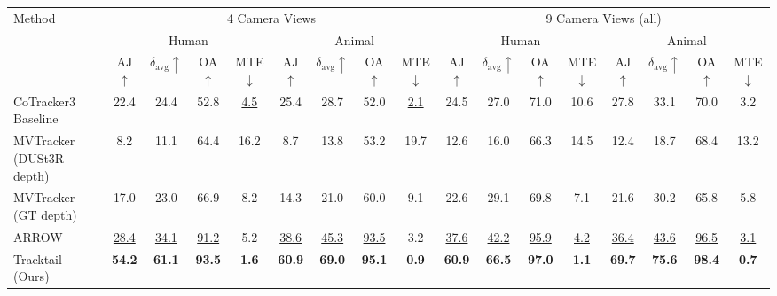 \begin{tabular}{l cccc cccc cccc cccc}
\toprule
\multirow{3}{*}{Method}
  & \multicolumn{8}{c}{4 Camera Views}
  & \multicolumn{8}{c}{9 Camera Views (all)} \\
\cmidrule(lr){2-9}\cmidrule(lr){10-17}
  & \multicolumn{4}{c}{Human}
  & \multicolumn{4}{c}{Animal}
  & \multicolumn{4}{c}{Human}
  & \multicolumn{4}{c}{Animal} \\
\cmidrule(lr){2-5}\cmidrule(lr){6-9}\cmidrule(lr){10-13}\cmidrule(lr){14-17}
  & AJ$\uparrow$ & $\delta_\text{avg}\uparrow$ & OA$\uparrow$ & MTE$\downarrow$
  & AJ$\uparrow$ & $\delta_\text{avg}\uparrow$ & OA$\uparrow$ & MTE$\downarrow$
  & AJ$\uparrow$ & $\delta_\text{avg}\uparrow$ & OA$\uparrow$ & MTE$\downarrow$
  & AJ$\uparrow$ & $\delta_\text{avg}\uparrow$ & OA$\uparrow$ & MTE$\downarrow$ \\
\midrule
\rowcolor{rowgray}
CoTracker3 Baseline~\cite{karaev24cotracker3}
  & 22.4 & 24.4 & 52.8 & \underline{4.5} & 25.4 & 28.7 & 52.0 & \underline{2.1} & 24.5 & 27.0 & 71.0 & 10.6 & 27.8 & 33.1 & 70.0 & 3.2 \\
MVTracker~\cite{rajic2025mvtracker} (DUSt3R depth)
  & 8.2 & 11.1 & 64.4 & 16.2 & 8.7 & 13.8 & 53.2 & 19.7 & 12.6 & 16.0 & 66.3 & 14.5 & 12.4 & 18.7 & 68.4 & 13.2 \\
\rowcolor{rowgray}
MVTracker~\cite{rajic2025mvtracker} (GT depth)
  & 17.0 & 23.0 & 66.9 & 8.2 & 14.3 & 21.0 & 60.0 & 9.1 & 22.6 & 29.1 & 69.8 & 7.1 & 21.6 & 30.2 & 65.8 & 5.8 \\
ARROW~\cite{fradlin2026arrow}
  & \underline{28.4} & \underline{34.1} & \underline{91.2} & 5.2 & \underline{38.6} & \underline{45.3} & \underline{93.5} & 3.2 & \underline{37.6} & \underline{42.2} & \underline{95.9} & \underline{4.2} & \underline{36.4} & \underline{43.6} & \underline{96.5} & \underline{3.1} \\
\rowcolor{rowgray}
Tracktail (Ours)
  & \textbf{54.2} & \textbf{61.1} & \textbf{93.5} & \textbf{1.6} & \textbf{60.9} & \textbf{69.0} & \textbf{95.1} & \textbf{0.9} & \textbf{60.9} & \textbf{66.5} & \textbf{97.0} & \textbf{1.1} & \textbf{69.7} & \textbf{75.6} & \textbf{98.4} & \textbf{0.7} \\
\bottomrule
\end{tabular}
